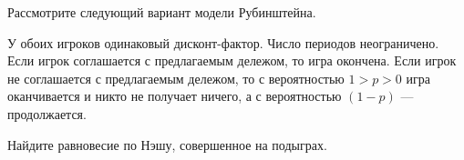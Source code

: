 \begin{problem}
 Рассмотрите следующий вариант модели Рубинштейна. \par %
У обоих игроков одинаковый дисконт-фактор. Число периодов
неограничено. Если игрок соглашается с предлагаемым дележом, то
игра окончена. Если игрок не соглашается с предлагаемым дележом,
то с вероятностью $1>p>0$ игра оканчивается и никто не получает
ничего, а с вероятностью $(1-p)$ --- продолжается. \par
Найдите равновесие по Нэшу, совершенное на подыграх.



\begin{sol}

\end{sol}
\end{problem}



